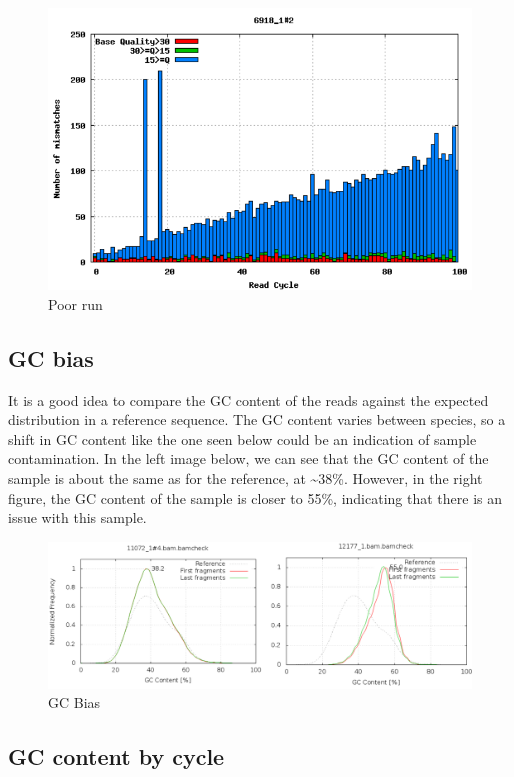 \documentclass[11pt]{article}
\makeatletter
\def\maxwidth{\ifdim\Gin@nat@width>\linewidth\linewidth
    \else\Gin@nat@width\fi}
\let\Oldincludegraphics\includegraphics
\renewcommand{\includegraphics}[1]{\Oldincludegraphics[width=.8\maxwidth, height=.55\textheight, keepaspectratio]{#1}}
\makeatother
\begin{document}
    \begin{figure}[H]
\centering
\includegraphics{img/mismatch_per_cycle_fail.png}
\caption{Poor run}
\end{figure}

    \hypertarget{gc-bias}{%
\subsection{GC bias}\label{gc-bias}}

It is a good idea to compare the GC content of the reads against the
expected distribution in a reference sequence. The GC content varies
between species, so a shift in GC content like the one seen below could
be an indication of sample contamination. In the left image below, we
can see that the GC content of the sample is about the same as for the
reference, at \textasciitilde{}38\%. However, in the right figure, the
GC content of the sample is closer to 55\%, indicating that there is an
issue with this sample.

    \begin{figure}[H]
\centering
\includegraphics{img/gc_bias.png}
\caption{GC Bias}
\end{figure}

    \hypertarget{gc-content-by-cycle}{%
\subsection{GC content by cycle}\label{gc-content-by-cycle}}
\end{document}
